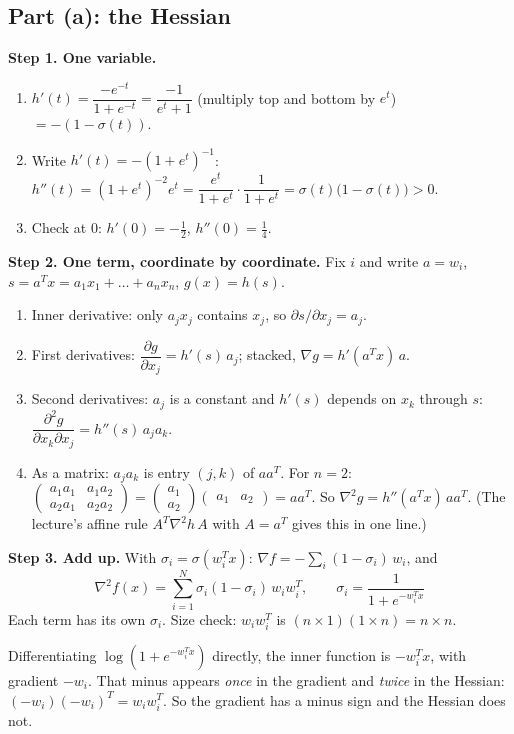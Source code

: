 \subsection*{Part (a): the Hessian}
\textbf{Step 1. One variable.}
\begin{enumerate}
  \item $h'(t)=\dfrac{-e^{-t}}{1+e^{-t}}=\dfrac{-1}{e^t+1}$ (multiply top and bottom by $e^t$) $=-(1-\sigma(t))$.
  \item Write $h'(t)=-(1+e^t)^{-1}$: $h''(t)=(1+e^t)^{-2}e^t=\dfrac{e^t}{1+e^t}\cdot\dfrac{1}{1+e^t}=\sigma(t)\big(1-\sigma(t)\big)>0$.
  \item Check at $0$: $h'(0)=-\tfrac12$, $h''(0)=\tfrac14$.
\end{enumerate}
\textbf{Step 2. One term, coordinate by coordinate.} Fix $i$ and write $a=w_i$, $s=a^Tx=a_1x_1+\dots+a_nx_n$, $g(x)=h(s)$.
\begin{enumerate}
  \item Inner derivative: only $a_jx_j$ contains $x_j$, so $\partial s/\partial x_j=a_j$.
  \item First derivatives: $\dfrac{\partial g}{\partial x_j}=h'(s)\,a_j$; stacked, $\nabla g=h'(a^Tx)\,a$.
  \item Second derivatives: $a_j$ is a constant and $h'(s)$ depends on $x_k$ through $s$: $\dfrac{\partial^2g}{\partial x_k\partial x_j}=h''(s)\,a_ja_k$.
  \item As a matrix: $a_ja_k$ is entry $(j,k)$ of $aa^T$. For $n=2$: $\begin{pmatrix}a_1a_1&a_1a_2\\a_2a_1&a_2a_2\end{pmatrix}=\begin{pmatrix}a_1\\a_2\end{pmatrix}\begin{pmatrix}a_1&a_2\end{pmatrix}=aa^T$.
        So $\nabla^2g=h''(a^Tx)\,aa^T$. (The lecture's affine rule $A^T\nabla^2h\,A$ with $A=a^T$ gives this in one line.)
\end{enumerate}
\textbf{Step 3. Add up.} With $\sigma_i=\sigma(w_i^Tx)$: $\nabla f=-\sum_i(1-\sigma_i)\,w_i$, and
\[ \boxed{\ \nabla^2f(x)=\sum_{i=1}^N\sigma_i(1-\sigma_i)\,w_iw_i^T,\qquad \sigma_i=\frac{1}{1+e^{-w_i^Tx}}\ } \]
Each term has its own $\sigma_i$. Size check: $w_iw_i^T$ is $(n\times1)(1\times n)=n\times n$.

\begin{intuition}
Differentiating $\log(1+e^{-w_i^Tx})$ directly, the inner function is $-w_i^Tx$, with gradient $-w_i$. That minus appears \emph{once} in the gradient and \emph{twice} in the Hessian:
$(-w_i)(-w_i)^T=w_iw_i^T$. So the gradient has a minus sign and the Hessian does not.
\end{intuition}

